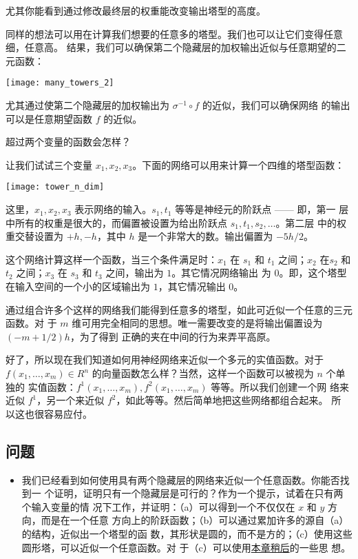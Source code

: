 尤其你能看到通过修改最终层的权重能改变输出塔型的高度。

同样的想法可以用在计算我们想要的任意多的塔型。我们也可以让它们变得任意细，任意高。
结果，我们可以确保第二个隐藏层的加权输出近似与任意期望的二元函数：
\begin{center}
  \texttt{[image: many\_towers\_2]}
\end{center}

尤其通过使第二个隐藏层的加权输出为 $\sigma^{-1} \circ f$ 的近似，我们可以确保网络
的输出可以是任意期望函数 $f$ 的近似。

超过两个变量的函数会怎样？

让我们试试三个变量 $x_1, x_2, x_3$。下面的网络可以用来计算一个四维的塔型函数：
\begin{center}
  \texttt{[image: tower\_n\_dim]}
\end{center}

这里，$x_1, x_2, x_3$ 表示网络的输入。$s_1, t_1$ 等等是神经元的阶跃点 —— 即，第一
层中所有的权重是很大的，而偏置被设置为给出阶跃点 $s_1, t_1, s_2, \ldots$。第二层
中的权重交替设置为 $+h, -h$，其中 $h$ 是一个非常大的数。输出偏置为 $-5h/2$。

这个网络计算这样一个函数，当三个条件满足时：$x_1$ 在 $s_1$ 和 $t_1$ 之间；$x_2$
在$s_2$ 和 $t_2$ 之间；$x_3$ 在 $s_3$ 和 $t_3$ 之间，输出为 $1$。其它情况网络输出
为 $0$。即，这个塔型在输入空间的一个小的区域输出为 $1$，其它情况输出 $0$。

通过组合许多个这样的网络我们能得到任意多的塔型，如此可近似一个任意的三元函数。对
于 $m$ 维可用完全相同的思想。唯一需要改变的是将输出偏置设为 $(-m+1/2)h$，为了得到
正确的夹在中间的行为来弄平高原。%

好了，所以现在我们知道如何用神经网络来近似一个多元的实值函数。对于 $f(x_1,
\ldots, x_m) \in R^n$ 的向量函数怎么样？当然，这样一个函数可以被视为 $n$ 个单独的
实值函数：$f^1(x_1, \ldots, x_m), f^2(x_1, \ldots, x_m)$ 等等。所以我们创建一个网
络来近似 $f^1$，另一个来近似 $f^2$，如此等等。然后简单地把这些网络都组合起来。 所
以这也很容易应付。

\subsection*{问题}

\begin{itemize}
  \item 我们已经看到如何使用具有两个隐藏层的网络来近似一个任意函数。你能否找到一
    个证明，证明只有一个隐藏层是可行的？作为一个提示，试着在只有两个输入变量的情
    况下工作，并证明：（a）可以得到一个不仅仅在 $x$ 和 $y$ 方向，而是在一个任意
    方向上的阶跃函数；（b）可以通过累加许多的源自（a）的结构，近似出一个塔型的函
    数，其形状是圆的，而不是方的；（c）使用这些圆形塔，可以近似一个任意函数。对
    于（c）可以使用\hyperref[sec:fixing_up_the_step_functions]{本章稍后}的一些思
    想。
\end{itemize}

